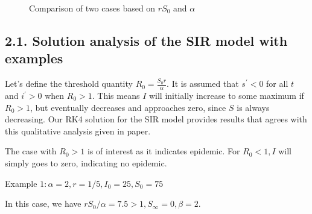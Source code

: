 \documentclass[10pt]{article}
\begin{document}
\begin{figure}[!htbp]
  \centering
  \hfill
  \caption{Comparison of two cases based on \(rS_0\) and \(\alpha\) }
\end{figure}
   
\subsection*{2.1. Solution analysis of the SIR model with examples}
Let's define the threshold quantity $R_{0}=\frac{S_{0} r}{\alpha}$. It is assumed that $s^{\prime}<0$ for all $t$ and $i^{\prime}>0$ when $R_{0}>1$. This means $I$ will initially increase to some maximum if $R_{0}>1$, but eventually decreases and approaches zero, since $S$ is always decreasing. Our RK4 solution for the SIR model provides results that agrees with this  qualitative analysis given in paper.

The case with $R_{0}>1$ is of interest as it indicates epidemic. For $R_{0}<1, I$ will simply goes to zero, indicating no epidemic. 

\vspace{2\baselineskip}
 Example $1: \alpha=2, r=1 / 5, I_{0}=25, S_{0}=75$


In this case, we have $r S_{0} / \alpha=7.5>1, S_{\infty}=0, \beta=2$. 
\end{document}
